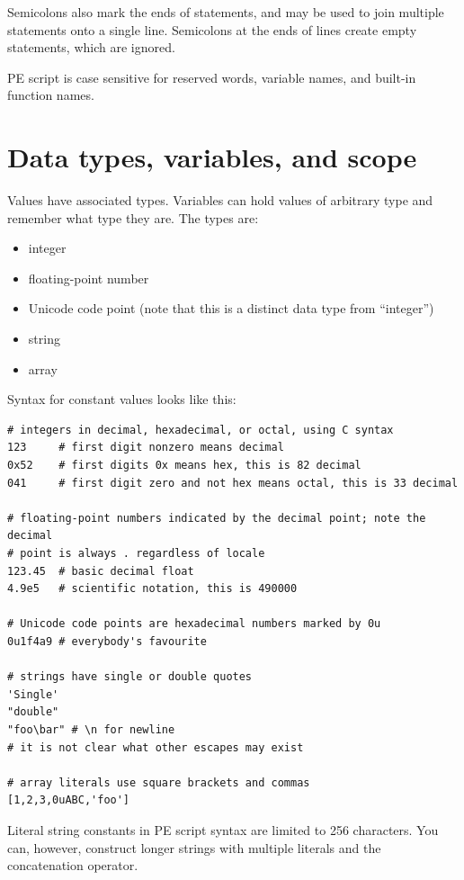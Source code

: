 \documentclass[11pt]{report}
\begin{document}
Semicolons also mark the ends of statements, and may be used to join
multiple statements onto a single line.  Semicolons at the ends of lines
create empty statements, which are ignored.

\begin{framed}
PE script is case sensitive for reserved words, variable names,
and built-in function names.
\end{framed}

\section{Data types, variables, and scope}

Values have associated types.  Variables can hold values of arbitrary type
and remember what type they are.  The types are:
\begin{itemize}
\item integer
\item floating-point number
\item Unicode code point (note that this is a distinct data type from
``integer'')
\item string
\item array
\end{itemize}

Syntax for constant values looks like this:
\begin{verbatim}
# integers in decimal, hexadecimal, or octal, using C syntax
123     # first digit nonzero means decimal
0x52    # first digits 0x means hex, this is 82 decimal
041     # first digit zero and not hex means octal, this is 33 decimal

# floating-point numbers indicated by the decimal point; note the decimal
# point is always . regardless of locale
123.45  # basic decimal float
4.9e5   # scientific notation, this is 490000

# Unicode code points are hexadecimal numbers marked by 0u
0u1f4a9 # everybody's favourite

# strings have single or double quotes
'Single'
"double"
"foo\bar" # \n for newline
# it is not clear what other escapes may exist

# array literals use square brackets and commas
[1,2,3,0uABC,'foo']
\end{verbatim}

\begin{framed}
Literal string constants in PE script syntax are limited to 256 characters. 
You can, however, construct longer strings with multiple literals and the
concatenation operator.
\end{framed}
\end{document}
